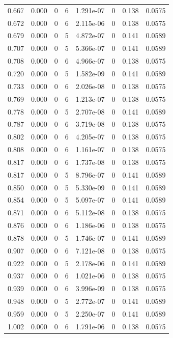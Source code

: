 \documentclass[preview]{standalone}
\begin{document}
{{{\begin{tabular}{L{1.2cm}C{1.2cm} C{0.3cm}C{0.5cm} C{1.4cm}C{1.4cm} C{1.4cm}C{1.4cm}}
  0.667  &  0.000  & 0     &  6 &  1.291e-07  & 0  & 0.138 &  0.0575   \\ 
  0.672  &  0.000  & 0     &  6 &  2.115e-06  & 0  & 0.138 &  0.0575   \\ 
  0.679  &  0.000  & 0     &  5 &  4.872e-07  & 0  & 0.141 &  0.0589   \\ 
  0.707  &  0.000  & 0     &  5 &  5.366e-07  & 0  & 0.141 &  0.0589   \\ 
  0.708  &  0.000  & 0     &  6 &  4.966e-07  & 0  & 0.138 &  0.0575   \\ 
  0.720  &  0.000  & 0     &  5 &  1.582e-09  & 0  & 0.141 &  0.0589   \\ 
  0.733  &  0.000  & 0     &  6 &  2.026e-08  & 0  & 0.138 &  0.0575   \\ 
  0.769  &  0.000  & 0     &  6 &  1.213e-07  & 0  & 0.138 &  0.0575   \\ 
  0.778  &  0.000  & 0     &  5 &  2.707e-08  & 0  & 0.141 &  0.0589   \\ 
  0.787  &  0.000  & 0     &  6 &  3.719e-08  & 0  & 0.138 &  0.0575   \\ 
  0.802  &  0.000  & 0     &  6 &  4.205e-07  & 0  & 0.138 &  0.0575   \\ 
  0.808  &  0.000  & 0     &  6 &  1.161e-07  & 0  & 0.138 &  0.0575   \\ 
  0.817  &  0.000  & 0     &  6 &  1.737e-08  & 0  & 0.138 &  0.0575   \\ 
  0.817  &  0.000  & 0     &  5 &  8.796e-07  & 0  & 0.141 &  0.0589   \\ 
  0.850  &  0.000  & 0     &  5 &  5.330e-09  & 0  & 0.141 &  0.0589   \\ 
  0.854  &  0.000  & 0     &  5 &  5.097e-07  & 0  & 0.141 &  0.0589   \\ 
  0.871  &  0.000  & 0     &  6 &  5.112e-08  & 0  & 0.138 &  0.0575   \\ 
  0.876  &  0.000  & 0     &  6 &  1.186e-06  & 0  & 0.138 &  0.0575   \\ 
  0.878  &  0.000  & 0     &  5 &  1.746e-07  & 0  & 0.141 &  0.0589   \\ 
  0.907  &  0.000  & 0     &  6 &  7.121e-08  & 0  & 0.138 &  0.0575   \\ 
  0.922  &  0.000  & 0     &  5 &  2.178e-06  & 0  & 0.141 &  0.0589   \\ 
  0.937  &  0.000  & 0     &  6 &  1.021e-06  & 0  & 0.138 &  0.0575   \\ 
  0.939  &  0.000  & 0     &  6 &  3.996e-09  & 0  & 0.138 &  0.0575   \\ 
  0.948  &  0.000  & 0     &  5 &  2.772e-07  & 0  & 0.141 &  0.0589   \\ 
  0.959  &  0.000  & 0     &  5 &  2.250e-07  & 0  & 0.141 &  0.0589   \\ 
  1.002  &  0.000  & 0     &  6 &  1.791e-06  & 0  & 0.138 &  0.0575   \\ 
\hline 
\end{tabular} 

}}}
\end{document}
